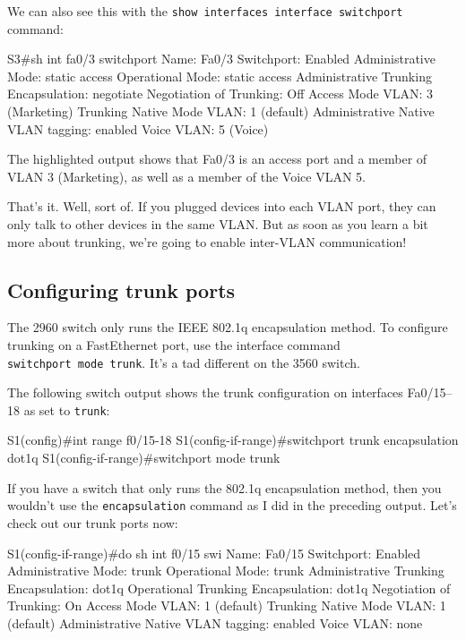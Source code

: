 We can also see this with the
\texttt{show\ interfaces\ interface\ switchport} command:

\begin{cli}
S3#sh int fa0/3 switchport
Name: Fa0/3
Switchport: Enabled
Administrative Mode: static access
Operational Mode: static access
Administrative Trunking Encapsulation: negotiate
Negotiation of Trunking: Off
Access Mode VLAN: 3 (Marketing)
Trunking Native Mode VLAN: 1 (default)
Administrative Native VLAN tagging: enabled
Voice VLAN: 5 (Voice)
\end{cli}

The highlighted output shows that Fa0/3 is an access port and a member
of VLAN 3 (Marketing), as well as a member of the Voice VLAN 5.

That's it. Well, sort of. If you plugged devices into each VLAN port,
they can only talk to other devices in the same VLAN. But as soon as you
learn a bit more about trunking, we're going to enable inter-VLAN
communication!



\subsection{Configuring trunk ports}

The 2960 switch only runs the IEEE 802.1q encapsulation method. To
configure trunking on a FastEthernet port, use the interface command
\texttt{switchport\ mode\ trunk}. It's a tad diff­erent on the 3560
switch.

The following switch output shows the trunk configuration on interfaces
Fa0/15--18 as set to \texttt{trunk}:

\begin{cli}
S1(config)#int range f0/15-18
S1(config-if-range)#switchport trunk encapsulation dot1q
S1(config-if-range)#switchport mode trunk
\end{cli}

If you have a switch that only runs the 802.1q encapsulation method,
then you wouldn't use the \texttt{encapsulation} command as I did in the
preceding output. Let's check out our trunk ports now:

\begin{cli}
S1(config-if-range)#do sh int f0/15 swi
Name: Fa0/15
Switchport: Enabled
Administrative Mode: trunk
Operational Mode: trunk
Administrative Trunking Encapsulation: dot1q
Operational Trunking Encapsulation: dot1q
Negotiation of Trunking: On
Access Mode VLAN: 1 (default)
Trunking Native Mode VLAN: 1 (default)
Administrative Native VLAN tagging: enabled
Voice VLAN: none
\end{cli}

